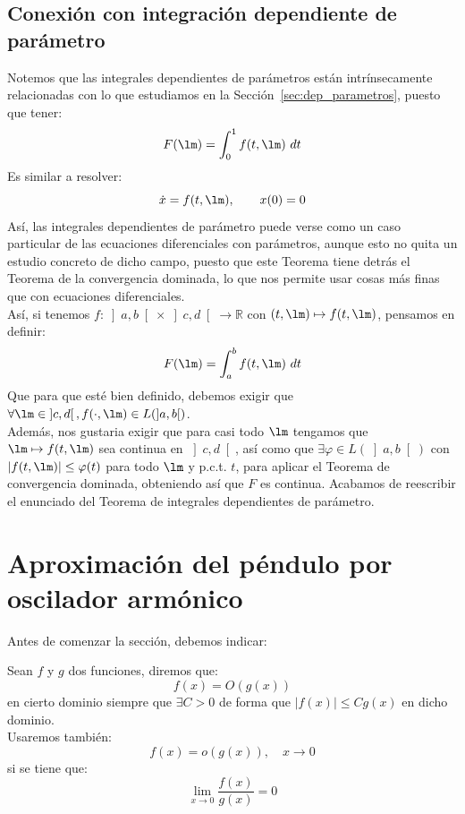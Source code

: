 \subsection{Conexión con integración dependiente de parámetro} %
\noindent
Notemos que las integrales dependientes de parámetros están intrínsecamente relacionadas con lo que estudiamos en la Sección~\ref{sec:dep_parametros}, puesto que tener:
\begin{equation*}
    F(\lm) = \int_{0}^{1} f(t,\lm)~dt 
\end{equation*}
Es similar a resolver:
\begin{equation*}
    \dot{x} = f(t,\lm), \qquad x(0) = 0
\end{equation*}
Así, las integrales dependientes de parámetro puede verse como un caso particular de las ecuaciones diferenciales con parámetros, aunque esto no quita un estudio concreto de dicho campo, puesto que este Teorema tiene detrás el Teorema de la convergencia dominada, lo que nos permite usar cosas más finas que con ecuaciones diferenciales.\\

\noindent
Así, si tenemos $f:\left]a,b\right[\times \left]c,d\right[\to \mathbb{R}$ con $(t,\lm)\mapsto f(t,\lm)$, pensamos en definir:
\begin{equation*}
    F(\lm) = \int_{a}^{b} f(t,\lm)~dt 
\end{equation*}
Que para que esté bien definido, debemos exigir que $\forall \lm \in \left]c,d\right[, f(\cdot ,\lm)\in L(\left]a,b\right[)$.\\

\noindent
Además, nos gustaria exigir que para casi todo $\lm$ tengamos que $\lm\mapsto f(t,\lm)$ sea continua en $\left]c,d\right[$, así como que $\exists \varphi \in L(\left]a,b\right[)$ con $|f(t,\lm)|\leq \varphi(t)$ para todo $\lm$ y p.c.t. $t$, para aplicar el Teorema de convergencia dominada, obteniendo así que $F$ es continua. Acabamos de reescribir el enunciado del Teorema de integrales dependientes de parámetro.

\section{Aproximación del péndulo por oscilador armónico}
\noindent
Antes de comenzar la sección, debemos indicar:
\begin{notacion}
    Sean $f$ y $g$ dos funciones, diremos que:
    \begin{equation*}
        f(x) = O(g(x))
    \end{equation*}
    en cierto dominio siempre que $\exists C>0$ de forma que $|f(x)| \leq Cg(x)$ en dicho dominio.\\

    \noindent
    Usaremos también:
    \begin{equation*}
        f(x) = o(g(x)), \quad x\to 0
    \end{equation*}
    si se tiene que:
    \begin{equation*}
        \lim_{x\to0}\frac{f(x)}{g(x)} = 0
    \end{equation*}
\end{notacion}

